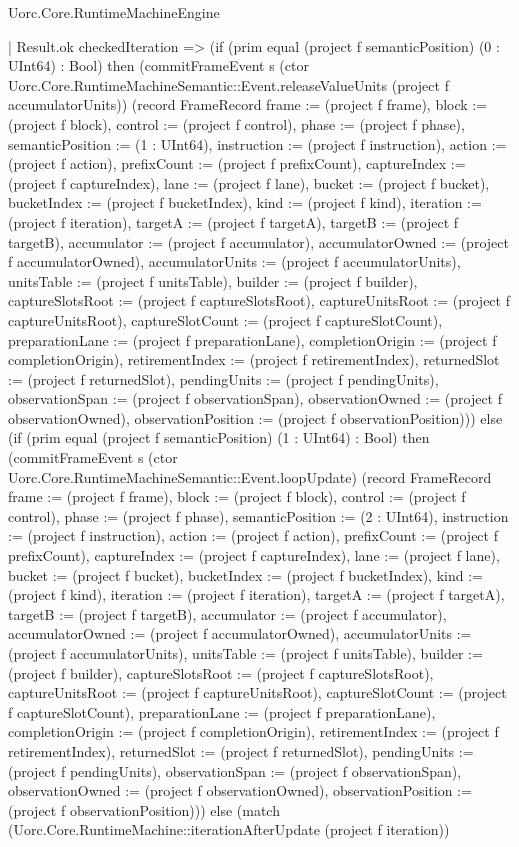 \begin{lexlean}{Uorc.Core.RuntimeMachineEngine}
\begin{semanticmodule}
{      | Result.ok checkedIteration => (if (prim equal (project f semanticPosition) (0 : UInt64) : Bool) then (commitFrameEvent s (ctor Uorc.Core.RuntimeMachineSemantic::Event.releaseValueUnits (project f accumulatorUnits)) (record FrameRecord {frame := (project f frame), block := (project f block), control := (project f control), phase := (project f phase), semanticPosition := (1 : UInt64), instruction := (project f instruction), action := (project f action), prefixCount := (project f prefixCount), captureIndex := (project f captureIndex), lane := (project f lane), bucket := (project f bucket), bucketIndex := (project f bucketIndex), kind := (project f kind), iteration := (project f iteration), targetA := (project f targetA), targetB := (project f targetB), accumulator := (project f accumulator), accumulatorOwned := (project f accumulatorOwned), accumulatorUnits := (project f accumulatorUnits), unitsTable := (project f unitsTable), builder := (project f builder), captureSlotsRoot := (project f captureSlotsRoot), captureUnitsRoot := (project f captureUnitsRoot), captureSlotCount := (project f captureSlotCount), preparationLane := (project f preparationLane), completionOrigin := (project f completionOrigin), retirementIndex := (project f retirementIndex), returnedSlot := (project f returnedSlot), pendingUnits := (project f pendingUnits), observationSpan := (project f observationSpan), observationOwned := (project f observationOwned), observationPosition := (project f observationPosition)})) else (if (prim equal (project f semanticPosition) (1 : UInt64) : Bool) then (commitFrameEvent s (ctor Uorc.Core.RuntimeMachineSemantic::Event.loopUpdate) (record FrameRecord {frame := (project f frame), block := (project f block), control := (project f control), phase := (project f phase), semanticPosition := (2 : UInt64), instruction := (project f instruction), action := (project f action), prefixCount := (project f prefixCount), captureIndex := (project f captureIndex), lane := (project f lane), bucket := (project f bucket), bucketIndex := (project f bucketIndex), kind := (project f kind), iteration := (project f iteration), targetA := (project f targetA), targetB := (project f targetB), accumulator := (project f accumulator), accumulatorOwned := (project f accumulatorOwned), accumulatorUnits := (project f accumulatorUnits), unitsTable := (project f unitsTable), builder := (project f builder), captureSlotsRoot := (project f captureSlotsRoot), captureUnitsRoot := (project f captureUnitsRoot), captureSlotCount := (project f captureSlotCount), preparationLane := (project f preparationLane), completionOrigin := (project f completionOrigin), retirementIndex := (project f retirementIndex), returnedSlot := (project f returnedSlot), pendingUnits := (project f pendingUnits), observationSpan := (project f observationSpan), observationOwned := (project f observationOwned), observationPosition := (project f observationPosition)})) else (match (Uorc.Core.RuntimeMachine::iterationAfterUpdate (project f iteration))
}
\end{semanticmodule}
\end{lexlean}
